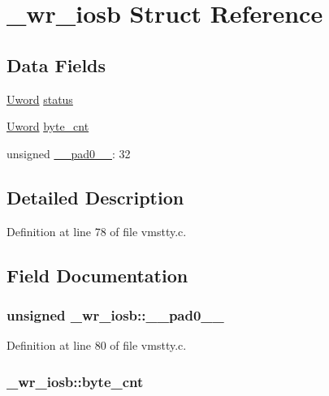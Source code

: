 \hypertarget{struct__wr__iosb}{\section{\+\_\+wr\+\_\+iosb Struct Reference}
\label{struct__wr__iosb}
}
\subsection*{Data Fields}
\begin{DoxyCompactItemize}
\item 
\hyperlink{vmstty_8c_a6124fd8a90b8b651aacc9d98026ad4e4}{Uword} \hyperlink{struct__wr__iosb_aaa8a8d695c1276f6aee864de35267537}{status}
\item 
\hyperlink{vmstty_8c_a6124fd8a90b8b651aacc9d98026ad4e4}{Uword} \hyperlink{struct__wr__iosb_a9947072dd7e47be7dc53d88ccb18e723}{byte\+\_\+cnt}
\item 
unsigned \hyperlink{struct__wr__iosb_ad82f1ac9dab8906bad9c89daafc4ca96}{\+\_\+\+\_\+pad0\+\_\+\+\_\+}\+: 32
\end{DoxyCompactItemize}


\subsection{Detailed Description}


Definition at line 78 of file vmstty.\+c.



\subsection{Field Documentation}
\hypertarget{struct__wr__iosb_ad82f1ac9dab8906bad9c89daafc4ca96}{
\subsubsection[{\+\_\+\+\_\+pad0\+\_\+\+\_\+}]{\setlength{\rightskip}{0pt plus 5cm}unsigned \+\_\+wr\+\_\+iosb\+::\+\_\+\+\_\+pad0\+\_\+\+\_\+}}\label{struct__wr__iosb_ad82f1ac9dab8906bad9c89daafc4ca96}


Definition at line 80 of file vmstty.\+c.

\hypertarget{struct__wr__iosb_a9947072dd7e47be7dc53d88ccb18e723}{
\subsubsection[{byte\+\_\+cnt}]{ \+\_\+wr\+\_\+iosb\+::byte\+\_\+cnt}}\label{struct__wr__iosb_a9947072dd7e47be7dc53d88ccb18e723}


